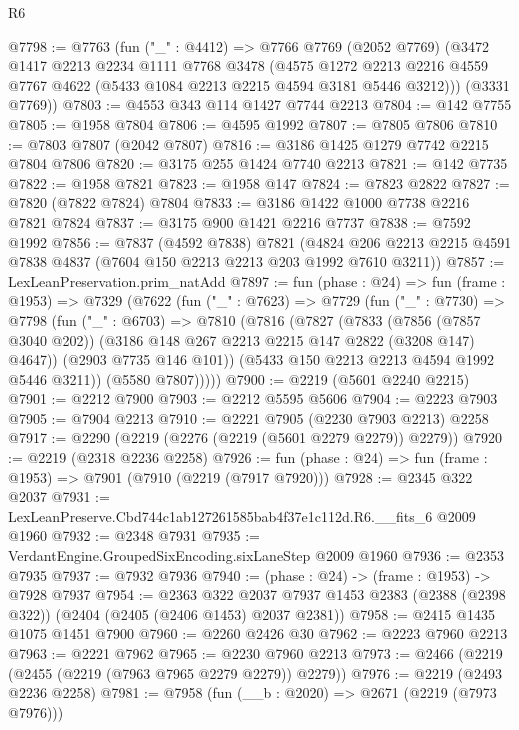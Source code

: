 \begin{lexlean}{R6}
\begin{coremodule}
@7798 := @7763
    (fun ("_" : @4412) =>
    @7766
      @7769
      (@2052 @7769)
      (@3472
        @1417
        @2213
        @2234
        @1111
        @7768
        @3478
        (@4575
          @1272
          @2213
          @2216
          @4559
          @7767
          @4622
          (@5433 @1084 @2213 @2215 @4594 @3181 @5446 @3212)))
      (@3331 @7769))
@7803 := @4553 @343 @114 @1427 @7744 @2213
@7804 := @142 @7755
@7805 := @1958 @7804
@7806 := @4595 @1992
@7807 := @7805 @7806
@7810 := @7803 @7807 (@2042 @7807)
@7816 := @3186 @1425 @1279 @7742 @2215 @7804 @7806
@7820 := @3175 @255 @1424 @7740 @2213
@7821 := @142 @7735
@7822 := @1958 @7821
@7823 := @1958 @147
@7824 := @7823 @2822
@7827 := @7820 (@7822 @7824) @7804
@7833 := @3186 @1422 @1000 @7738 @2216 @7821 @7824
@7837 := @3175 @900 @1421 @2216 @7737
@7838 := @7592 @1992
@7856 := @7837
    (@4592 @7838)
    @7821
    (@4824 @206 @2213 @2215 @4591 @7838 @4837 (@7604 @150 @2213 @2213 @203 @1992 @7610 @3211))
@7857 := LexLeanPreservation.prim_natAdd
@7897 := fun (phase : @24) =>
  fun (frame : @1953) =>
  @7329
    (@7622
      (fun ("_" : @7623) =>
      @7729
        (fun ("_" : @7730) =>
        @7798
          (fun ("_" : @6703) =>
          @7810
            (@7816
              (@7827
                (@7833
                  (@7856 (@7857 @3040 @202))
                  (@3186 @148 @267 @2213 @2215 @147 @2822 (@3208 @147) @4647))
                (@2903 @7735 @146 @101))
              (@5433 @150 @2213 @2213 @4594 @1992 @5446 @3211))
            (@5580 @7807)))))
@7900 := @2219 (@5601 @2240 @2215)
@7901 := @2212 @7900
@7903 := @2212 @5595 @5606
@7904 := @2223 @7903
@7905 := @7904 @2213
@7910 := @2221 @7905 (@2230 @7903 @2213) @2258
@7917 := @2290 (@2219 (@2276 (@2219 (@5601 @2279 @2279)) @2279))
@7920 := @2219 (@2318 @2236 @2258)
@7926 := fun (phase : @24) => fun (frame : @1953) => @7901 (@7910 (@2219 (@7917 @7920)))
@7928 := @2345 @322 @2037
@7931 := LexLeanPreserve.Cbd744c1ab127261585bab4f37e1c112d.R6.__fits_6 @2009 @1960
@7932 := @2348 @7931
@7935 := VerdantEngine.GroupedSixEncoding.sixLaneStep @2009 @1960
@7936 := @2353 @7935
@7937 := @7932 @7936
@7940 := (phase : @24) -> (frame : @1953) -> @7928 @7937
@7954 := @2363
    @322
    @2037
    @7937
    @1453
    @2383
    (@2388 (@2398 @322))
    (@2404 (@2405 (@2406 @1453) @2037 @2381))
@7958 := @2415 @1435 @1075 @1451 @7900
@7960 := @2260 @2426 @30
@7962 := @2223 @7960 @2213
@7963 := @2221 @7962
@7965 := @2230 @7960 @2213
@7973 := @2466 (@2219 (@2455 (@2219 (@7963 @7965 @2279 @2279)) @2279))
@7976 := @2219 (@2493 @2236 @2258)
@7981 := @7958 (fun (__b : @2020) => @2671 (@2219 (@7973 @7976)))

\end{coremodule}
\end{lexlean}
